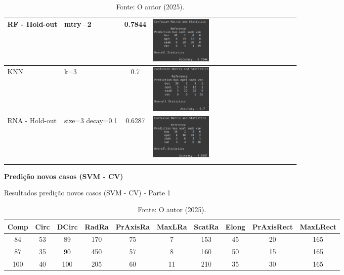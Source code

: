 \begin{longtable}{|>{\centering\arraybackslash}p{2.5cm}|>{\centering\arraybackslash}m{2.5cm}|c|m{7cm}|}
\hline
RF - Hold-out    & mtry=2 & 0.7844 & \includegraphics[width=0.4\textwidth]{apendices/fig/8_IAA008_5.png} \\
\hline
KNN    & k=3 & 0.7 & \includegraphics[width=0.4\textwidth]{apendices/fig/8_IAA008_6.png} \\
\hline
RNA - Hold-out    & size=3 decay=0.1 & 0.6287 & \includegraphics[width=0.4\textwidth]{apendices/fig/8_IAA008_7.png} \\
\hline
\caption*{Fonte: O autor (2025).}
\end{longtable}


\begin{center}
    \textbf{Predição novos casos (SVM - CV)}
\end{center}

\begin{table}[H]
\caption{Resultados predição novos casos (SVM - CV) - Parte 1}
\hspace*{-1.5cm} %
\begin{minipage}{\textwidth}
\centering
\begin{tabular}{|c|c|c|c|c|c|c|c|c|c|}
\hline
Comp & Circ & DCirc & RadRa & PrAxisRa & MaxLRa & ScatRa & Elong & PrAxisRect & MaxLRect \\
\hline
84   & 53   & 89    & 170   & 75       & 7      & 153    & 45    & 20         & 165 \\
\hline
87   & 35   & 90    & 450   & 57       & 8      & 160    & 50    & 15         & 165 \\
\hline
100  & 40   & 100   & 205   & 60       & 11     & 210    & 35    & 30         & 165 \\
\hline
\end{tabular}
\end{minipage}
\caption*{Fonte: O autor (2025).}
\end{table}

